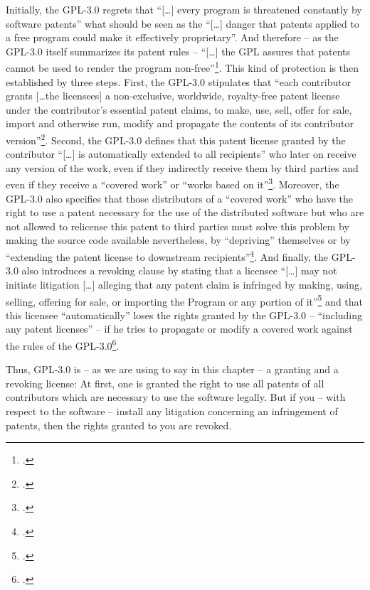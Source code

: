 Initially, the GPL-3.0 regrets that \enquote{[\ldots] every program is
threatened constantly by software patents} what should be seen as the
\enquote{[\ldots] danger that patents applied to a free program could make it
effectively proprietary}. And therefore -- as the GPL-3.0 itself summarizes its
patent rules -- \enquote{[\ldots] the GPL assures that patents cannot be used to
render the program non-free}\footcite[cf.][\nopage wp.\
Preamble]{Gpl30OsiLicense2007a}. This kind of protection is then established by
three steps. First, the GPL-3.0 stipulates that \enquote{each contributor grants
[\ldots the licensees] a non-exclusive, worldwide, royalty-free patent license
under the contributor's essential patent claims, to make, use, sell, offer for
sale, import and otherwise run, modify and propagate the contents of its
contributor version}\footcite[cf.][\nopage wp.\ §11]{Gpl30OsiLicense2007a}.
Second, the GPL-3.0 defines that this patent license granted by the contributor
\enquote{[\ldots] is automatically extended to all recipients} who later on
receive any version of the work, even if they indirectly receive them by third
parties and even if they receive a \enquote{covered work} or \enquote{works
based on it}\footcite[cf.][\nopage wp.\ §11]{Gpl30OsiLicense2007a}. Moreover,
the GPL-3.0 also specifies that those distributors of a \enquote{covered work}
who have the right to use a patent necessary for the use of the distributed
software but who are not allowed to relicense this patent to third parties must
solve this problem by making the source code available nevertheless, by
\enquote{depriving} themselves or by \enquote{extending the patent license to
downstream recipients}\footcite[cf.][\nopage wp.\ §11]{Gpl30OsiLicense2007a}.
And finally, the GPL-3.0 also introduces a revoking clause by stating that a
licensee \enquote{[\ldots] may not initiate litigation [\ldots] alleging that
any patent claim is infringed by making, using, selling, offering for sale, or
importing the Program or any portion of it}\footcite[cf.][\nopage wp.\
§10]{Gpl30OsiLicense2007a} and that this licensee \enquote{automatically} loses
the rights granted by the GPL-3.0 -- \enquote{including any patent licenses} --
if he tries to propagate or modify a covered work against the rules of the
GPL-3.0\footcite[cf.][\nopage wp.\ §8]{Gpl30OsiLicense2007a}.

Thus, GPL-3.0 is -- as we are using to say in this chapter -- a granting and a
revoking license: At first, one is granted the right to use all patents of all
contributors which are necessary to use the software legally. But if you -- with
respect to the software -- install any litigation concerning an infringement of
patents, then the rights granted to you are revoked.


